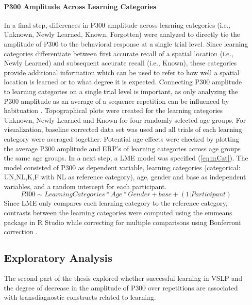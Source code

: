 \paragraph{P300 Amplitude Across Learning Categories}
In a final step, differences in P300 amplitude across learning categories (i.e., Unknown, Newly Learned, Known, Forgotten) were analyzed to directly tie the amplitude of P300 to the behavioral response at a single trial level. Since learning categories differentiate between first accurate recall of a spatial location (i.e., Newly Learned) and subsequent accurate recall (i.e., Known), these categories provide additional information which can be used to refer to how well a spatial location is learned or to what degree it is expected. Connecting P300 amplitude to learning categories on a single trial level is important, as only analyzing the P300 amplitude as an average of a sequence repetition can be influenced by habituation \parencite{ravdenHabituationP300Visual1998}. 
Topographical plots were created for the learning categories Unknown, Newly Learned and Known for four randomly selected age groups. For visualization, baseline corrected data set was used and all trials of each learning category were averaged together. Potential age effects were checked by plotting the average P300 amplitude and ERP's of learning categories across age groups the same age groups. In a next step, a LME model was specified (\ref{eq:mCat}). The model consisted of P300 as dependent variable, learning categories (categorical: UN,NL,K,F with NL as reference category), age, gender and base as independent variables, and a random intercept for each participant.  
\begin{equation}\label{eq:mCat}
P300 \sim LearningCategories*Age*Gender + base + (1 | Participant)
\end{equation}
Since LME only compares each learning category to the reference category, contrasts between the learning categories were computed using the emmeans package in R Studio while correcting for multiple comparisons using Bonferroni correction \parencite{lenthPackageEmmeans2019}. 

\subsection{Exploratory Analysis}
The second part of the thesis explored whether successful learning in VSLP and the degree of decrease in the amplitude of P300 over repetitions are associated with transdiagnostic constructs related to learning. 

